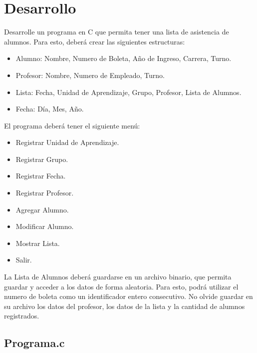 \documentclass{article}
\begin{document}
	\newpage
	
	\section{Desarrollo}
	
	Desarrolle un programa en C que permita tener una lista de asistencia de alumnos.
	Para esto, deberá crear las siguientes estructuras:
	
	\begin{itemize}
		\item Alumno: Nombre, Numero de Boleta, Año de Ingreso, Carrera, Turno.
		\item Profesor: Nombre, Numero de Empleado, Turno.
		\item Lista: Fecha, Unidad de Aprendizaje, Grupo, Profesor, Lista de Alumnos.
		\item Fecha: Día, Mes, Año.
	\end{itemize}
	
	El programa deberá tener el siguiente menú:
	
	\begin{itemize}
		\item Registrar Unidad de Aprendizaje.
		\item Registrar Grupo.
		\item Registrar Fecha.
		\item Registrar Profesor.
		\item Agregar Alumno.
		\item Modificar Alumno.
		\item Mostrar Lista.
		\item Salir.
	\end{itemize}
	
	La Lista de Alumnos deberá guardarse en un archivo binario, que permita guardar y acceder a los datos de forma aleatoria. Para esto, podrá utilizar el numero de boleta como un identificador entero consecutivo. No olvide guardar en su archivo los datos del profesor, los datos de la lista y la cantidad de alumnos registrados.
	
	\newpage
	
	\subsection{Programa.c}
	
\end{document}
